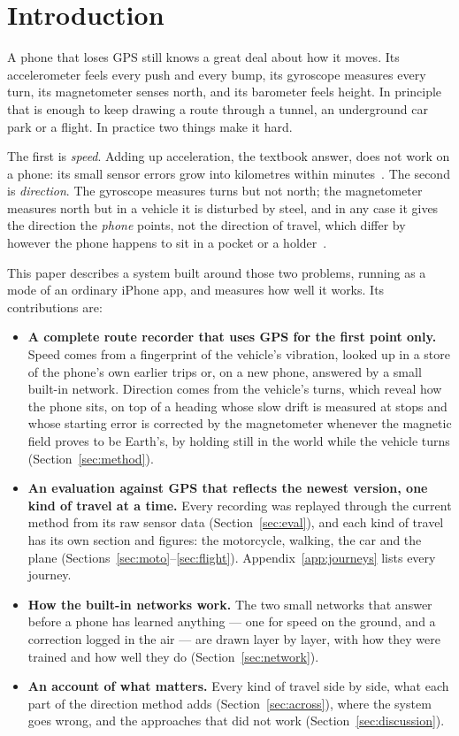 \documentclass[11pt]{article}
\begin{document}
\section{Introduction}

A phone that loses GPS still knows a great deal about how it moves. Its accelerometer feels every
push and every bump, its gyroscope measures every turn, its magnetometer senses north, and its
barometer feels height. In principle that is enough to keep drawing a route through a tunnel, an
underground car park or a flight. In practice two things make it hard.

The first is \emph{speed}. Adding up acceleration, the textbook answer, does not work on a phone:
its small sensor errors grow into kilometres within minutes~\cite{groves,memserrors}. The second is
\emph{direction}. The gyroscope measures turns but not north; the magnetometer measures north but in
a vehicle it is disturbed by steel, and in any case it gives the direction the \emph{phone} points,
not the direction of travel, which differ by however the phone happens to sit in a pocket or a
holder~\cite{pdrheading}.

This paper describes a system built around those two problems, running as a mode of an ordinary
iPhone app, and measures how well it works. Its contributions are:

\begin{itemize}
\item \textbf{A complete route recorder that uses GPS for the first point only.} Speed comes from a
fingerprint of the vehicle's vibration, looked up in a store of the phone's own earlier trips or, on
a new phone, answered by a small built-in network. Direction comes from the vehicle's turns, which
reveal how the phone sits, on top of a heading whose slow drift is measured at stops and whose
starting error is corrected by the magnetometer whenever the magnetic field proves to be Earth's, by
holding still in the world while the vehicle turns (Section~\ref{sec:method}).
\item \textbf{An evaluation against GPS that reflects the newest version, one kind of travel at a time.}
Every recording was replayed through the current method from its raw sensor data
(Section~\ref{sec:eval}), and each kind of travel has its own section and figures: the motorcycle, walking,
the car and the plane (Sections~\ref{sec:moto}--\ref{sec:flight}). Appendix~\ref{app:journeys} lists every
journey.
\item \textbf{How the built-in networks work.} The two small networks that answer before a phone has
learned anything --- one for speed on the ground, and a correction logged in the air --- are drawn layer by layer, with how they
were trained and how well they do (Section~\ref{sec:network}).
\item \textbf{An account of what matters.} Every kind of travel side by side, what each part of the
direction method adds (Section~\ref{sec:across}), where the system goes wrong, and the approaches that did
not work (Section~\ref{sec:discussion}).
\end{itemize}
\end{document}
